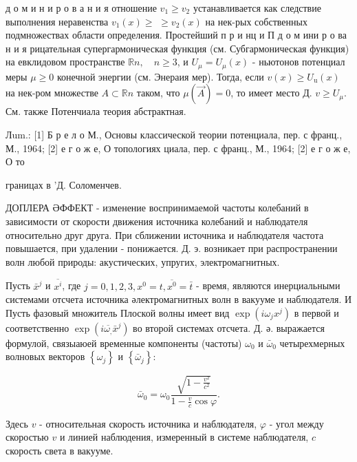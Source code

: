 \documentclass[10pt]{article}
\begin{document}
д о м и н и р о в а н и я отношение $v_{1} \geqslant v_{2}$ устанавливается как следствие выполнения неравенства $v_{1}(x) \geqslant$ $\geqslant v_{2}(x)$ на нек-рых собственных подмножествах области определения. Простейший п р и нц и П д о м ини р о ва н и я рицательная супергармоническая функция (см. Субгармоническая функция) на евклидовом пространстве $\mathbb{R} n, \quad n \geqslant 3$, и $U_{\mu}=U_{\mu}(x)$ - ньютонов потенциал меры $\mu \geqslant 0$ конечной энергии (см. Энераия мер). Тогда, если $v(x) \geqslant U_{\mathrm{u}}(x)$ на нек-ром множестве $A \subset \mathbb{R} n$ таком, что $\mu(\vec{A})=0$, то имеет место Д. $v \geqslant U_{\mu}$. См. также Потенчиала теория абстрактная.



Лum.: [1] Б р е л о М., Основы классической теории потенциала, пер. с франц., М., 1964; [2] е г о ж е, О топологиях циала, пер. с франц., М., 1964; [2] е г о ж е, О то



границах в 'Д. Соломенчев.



ДОПЛЕРА ӘФФЕКТ - изменение воспринимаемой частоты колебаний в зависимости от скорости движения источника колебаний и наблюдателя относительно друг друга. При сближении источника и наблюдателя частота повышается, при удалении - понижается. Д. э. возникает при распространении волн любой природы: акустических, упругих, электромагнитных.



Пусть $\bar{x}^{j}$ и $\overline{x^{i}}$, где $j=0,1,2,3, x^{0}=t, \overline{x^{0}}=\bar{t}$ - время, являются инерциальными системами отсчета источника әлектромагнитных волн в вакууме и наблюдателя. И Пусть фазовый множитель Плоской волны имеет вид $\exp \left(i \omega_{j} x^{j}\right)$ в первой и соответственно $\exp \left(i \overline{\omega_{,}} \bar{x}^{j}\right)$ во второй системах отсчета. Д. ә. выражается формулой, связыаюей временные компоненты (частоты) $\omega_{0}$ и $\bar{\omega}_{0}$ четырехмерных волновых векторов $\left\{\omega_{j}\right\}$ и $\left\{\bar{\omega}_{j}\right\}:$



\[

\bar{\omega}_{0}=\omega_{0} \frac{\sqrt{1-\frac{v^{2}}{c^{2}}}}{1-\frac{v}{c} \cos \varphi} .

\]



Здесь $v$ - относительная скорость источника и наблюдателя, $\varphi$ - угол между скоростью $v$ и линией наблюдения, измеренный в системе наблюдателя, $c$ скорость света в вакууме.
\end{document}
